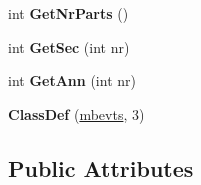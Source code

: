 \begin{DoxyCompactItemize}
int {\bfseries Get\+Nr\+Parts} ()
\item 
\mbox{\label{classmbevts_ac000de59a0294db6cabb283288c086ed}} 
int {\bfseries Get\+Sec} (int nr)
\item 
\mbox{\label{classmbevts_a08d777dc8c5cdf6d51fbe0ca6d111870}} 
int {\bfseries Get\+Ann} (int nr)
\item 
\mbox{\label{classmbevts_acd52cb238ea4a902fde6906f1a60f30a}} 
{\bfseries Class\+Def} (\hyperlink{classmbevts}{mbevts}, 3)
\end{DoxyCompactItemize}
\subsection*{Public Attributes}
